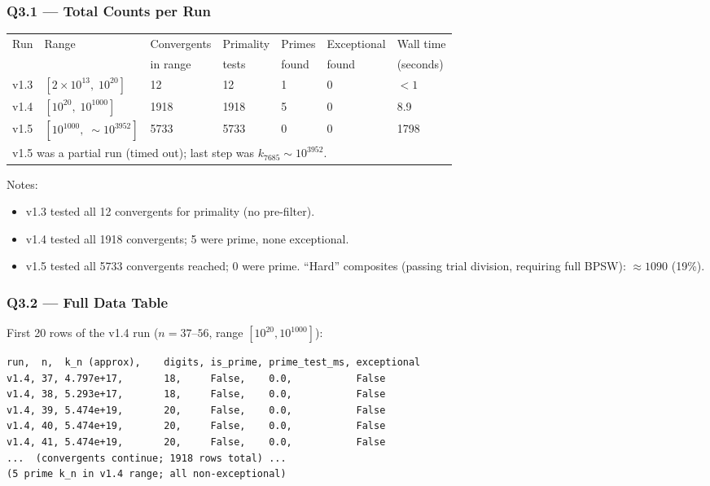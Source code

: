 \documentclass[11pt,a4paper]{article}
\begin{document}
\subsubsection*{Q3.1 --- Total Counts per Run}

\begin{longtable}{lllllll}
\toprule
Run & Range & Convergents & Primality & Primes & Exceptional & Wall time \\
    &       & in range    & tests     & found  & found       & (seconds) \\
\midrule
v1.3 & $[2{\times}10^{13},\;10^{20}]$ & 12 & 12 & 1 & 0 & $<1$ \\
v1.4 & $[10^{20},\;10^{1000}]$ & 1918 & 1918 & 5 & 0 & 8.9 \\
v1.5 & $[10^{1000},\;\sim\!10^{3952}]$ & 5733 & 5733 & 0 & 0 & 1798 \\
\bottomrule
\multicolumn{7}{l}{\footnotesize v1.5 was a partial run (timed out); last step was $k_{7685} \sim 10^{3952}$.}
\end{longtable}

Notes:
\begin{itemize}
  \item v1.3 tested all 12 convergents for primality (no pre-filter).
  \item v1.4 tested all 1918 convergents; 5 were prime, none exceptional.
  \item v1.5 tested all 5733 convergents reached; 0 were prime.
        ``Hard'' composites (passing trial division, requiring full BPSW): $\approx 1090$ (19\%).
\end{itemize}

\subsubsection*{Q3.2 --- Full Data Table}

First 20 rows of the v1.4 run ($n = 37$--$56$, range $[10^{20}, 10^{1000}]$):

\begin{lstlisting}
run,  n,  k_n (approx),    digits, is_prime, prime_test_ms, exceptional
v1.4, 37, 4.797e+17,       18,     False,    0.0,           False
v1.4, 38, 5.293e+17,       18,     False,    0.0,           False
v1.4, 39, 5.474e+19,       20,     False,    0.0,           False
v1.4, 40, 5.474e+19,       20,     False,    0.0,           False
v1.4, 41, 5.474e+19,       20,     False,    0.0,           False
...  (convergents continue; 1918 rows total) ...
(5 prime k_n in v1.4 range; all non-exceptional)
\end{lstlisting}
\end{document}
